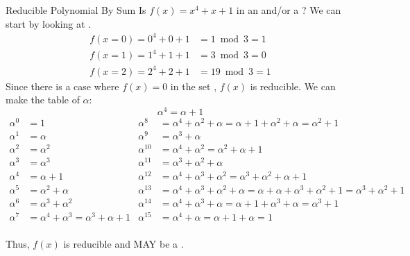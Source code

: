 \begin{example}{Reducible Polynomial By Sum}
  Is $f(x) = x^{4} + x + 1$ in  an   and/or a ?
  \tcblower{}
  We can start by looking at .
  \begin{align*}
    f(x=0) = 0^{4} + 0 + 1 &= 1 \bmod 3 = 1 \\
    f(x=1) = 1^{4} + 1 + 1 &= 3 \bmod 3 = 0 \\
    f(x=2) = 2^{4} + 2 + 1 &= 19 \bmod 3 = 1
  \end{align*}
  Since there is a case where $f(x) = 0$ in the set , $f(x)$ is reducible.
  We can make the table of $\alpha$:
  \begin{equation*}
    \alpha^{4} = \alpha + 1
  \end{equation*}
  \begin{align*}
    \alpha^{0} &= 1 & \alpha^{8} &= \alpha^{4} + \alpha^{2} + \alpha = \alpha + 1 + \alpha^{2} + \alpha = \alpha^{2} + 1 \\
    \alpha^{1} &= \alpha & \alpha^{9} &= \alpha^{3} + \alpha \\
    \alpha^{2} &= \alpha^{2} & \alpha^{10} &= \alpha^{4} + \alpha^{2} = \alpha^{2} + \alpha + 1\\
    \alpha^{3} &= \alpha^{3} & \alpha^{11} &= \alpha^{3} + \alpha^{2} + \alpha \\
    \alpha^{4} &= \alpha + 1 & \alpha^{12} &= \alpha^{4} + \alpha^{3} + \alpha^{2} = \alpha^{3} + \alpha^{2} + \alpha + 1 \\
    \alpha^{5} &= \alpha^{2} + \alpha & \alpha^{13} &= \alpha^{4} + \alpha^{3} + \alpha^{2} + \alpha = \alpha + \alpha + \alpha^{3} + \alpha^{2} + 1 = \alpha^{3} + \alpha^{2} + 1 \\
    \alpha^{6} &= \alpha^{3} + \alpha^{2} & \alpha^{14} &= \alpha^{4} + \alpha^{3} + \alpha = \alpha + 1 + \alpha^{3} + \alpha = \alpha^{3} + 1 \\
    \alpha^{7} &= \alpha^{4} + \alpha^{3} = \alpha^{3} + \alpha + 1 & \alpha^{15} &= \alpha^{4} + \alpha = \alpha + 1 + \alpha = 1 \\
  \end{align*}

  Thus, $f(x)$ is reducible and MAY be a .
\end{example}

